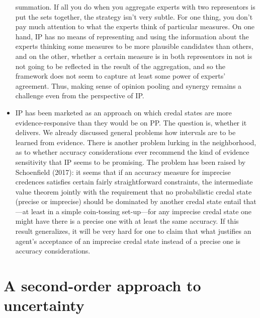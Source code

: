 \documentclass[
  10pt,
  dvipsnames,enabledeprecatedfontcommands]{scrartcl}
\begin{document}
\begin{itemize}
  summation. If all you do when you aggregate experts with two
  representors is put the sets together, the strategy isn't very subtle.
  For one thing, you don't pay much attention to what the experts think
  of particular measures. On one hand, IP has no means of representing
  and using the information about the experts thinking some measures to
  be more plausible candidates than others, and on the other, whether a
  certain measure is in both representors in not is not going to be
  reflected in the result of the aggregation, and so the framework does
  not seem to capture at least some power of experts' agreement. Thus,
  making sense of opinion pooling and synergy remains a challenge even
  from the perspective of \textsf{IP}.
\item
  \textsf{IP} has been marketed as an approach on which credal states
  are more evidence-responsive than they would be on \textsf{PP}. The
  question is, whether it delivers. We already discussed general
  problems how intervals are to be learned from evidence. There is
  another problem lurking in the neighborhood, as to whether accuracy
  considerations ever recommend the kind of evidence sensitivity that
  \textsf{IP} seems to be promising. The problem has been raised by
  Schoenfield (2017): it seems that if an accuracy measure for imprecise
  credences satisfies certain fairly straightforward constraints, the
  intermediate value theorem jointly with the requirement that no
  probabilistic credal state (precise or imprecise) should be dominated
  by another credal state entail that---at least in a simple
  coin-tossing set-up---for any imprecise credal state one might have
  there is a precise one with at least the same accuracy. If this result
  generalizes, it will be very hard for one to claim that what justifies
  an agent's acceptance of an imprecise credal state instead of a
  precise one is accuracy considerations.
\end{itemize}

\hypertarget{a-second-order-approach-to-uncertainty}{%
\section{A second-order approach to
uncertainty}\label{a-second-order-approach-to-uncertainty}}
\end{document}
